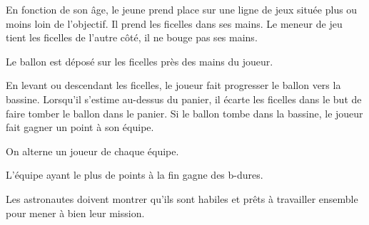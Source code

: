\documentclass{grand-jeu}
\begin{document}
\begin{liste-materiel}
\end{liste-materiel}

\begin{regles}
En fonction de son âge, le jeune prend place sur une ligne de jeux située plus ou moins loin de l'objectif. Il prend les ficelles dans ses mains. Le meneur de jeu tient les ficelles de l'autre côté, il ne bouge pas ses mains.

Le ballon est déposé sur les ficelles près des mains du joueur.

En levant ou descendant les ficelles, le joueur fait progresser le ballon vers la bassine. Lorsqu'il s'estime au-dessus du panier, il écarte les ficelles dans le but de faire tomber le ballon dans le panier. Si le ballon tombe dans la bassine, le joueur fait gagner un point à son équipe.

On alterne un joueur de chaque équipe.

L'équipe ayant le plus de points à  la fin gagne des b-dures.
 
\end{regles}

\begin{imaginaire}
Les astronautes doivent montrer qu'ils sont habiles et prêts à travailler ensemble pour mener à bien leur mission.  
\end{imaginaire}

\begin{moments-stop}
\end{moments-stop}
\end{document}
